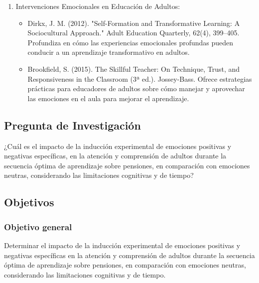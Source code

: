 \documentclass{article}
\begin{document}
\begin{enumerate}
\begin{itemize}
    \end{itemize}
    \item Intervenciones Emocionales en Educación de Adultos:
    \begin{itemize}
        \item Dirkx, J. M. (2012). "Self-Formation and Transformative Learning: A Sociocultural Approach." Adult Education Quarterly, 62(4), 399–405. Profundiza en cómo las experiencias emocionales profundas pueden conducir a un aprendizaje transformativo en adultos.
        \item Brookfield, S. (2015). The Skillful Teacher: On Technique, Trust, and Responsiveness in the Classroom (3ª ed.). Jossey-Bass. Ofrece estrategias prácticas para educadores de adultos sobre cómo manejar y aprovechar las emociones en el aula para mejorar el aprendizaje.
    \end{itemize}
\end{enumerate}

\subsection{Pregunta de Investigación}
¿Cuál es el impacto de la inducción experimental de emociones positivas y negativas específicas, en la atención y comprensión de adultos durante la secuencia óptima de aprendizaje sobre pensiones, en comparación con emociones neutras, considerando las limitaciones cognitivas y de tiempo?

\subsection{Objetivos}
\subsubsection{Objetivo general}
Determinar el impacto de la inducción experimental de emociones positivas y negativas específicas en la atención y comprensión de adultos durante la secuencia óptima de aprendizaje sobre pensiones, en comparación con emociones neutras, considerando las limitaciones cognitivas y de tiempo.
\end{document}
